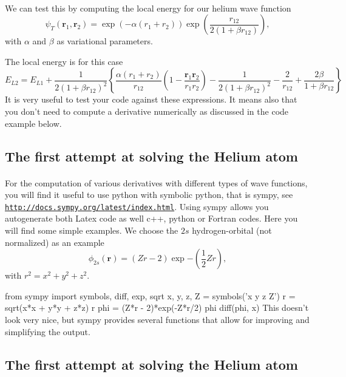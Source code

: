 \documentclass[%
twoside,                 %
final,                   %
10pt]{article}
\begin{document}
\paragraph{}

We can test this by computing the local energy for our helium wave function
\[
   \psi_{T}(\bm{r}_1,\bm{r}_2) = 
   \exp{\left(-\alpha(r_1+r_2)\right)}
   \exp{\left(\frac{r_{12}}{2(1+\beta r_{12})}\right)}, 
\]
with $\alpha$ and $\beta$ as variational parameters.

The local energy is for this case 
\[ 
E_{L2} = E_{L1}+\frac{1}{2(1+\beta r_{12})^2}\left\{\frac{\alpha(r_1+r_2)}{r_{12}}(1-\frac{\bm{r}_1\bm{r}_2}{r_1r_2})-\frac{1}{2(1+\beta r_{12})^2}-\frac{2}{r_{12}}+\frac{2\beta}{1+\beta r_{12}}\right\}
\]
It is very useful to test your code against these expressions. It means also that you don't need to
compute a derivative numerically as discussed in the code example below.



\subsection{The first attempt at solving the Helium atom}

\paragraph{}
For the computation of various derivatives with different types of wave functions, you will find it useful to use python with symbolic python, that is sympy, see \href{{http://docs.sympy.org/latest/index.html}}{\nolinkurl{http://docs.sympy.org/latest/index.html}}.  Using sympy allows you autogenerate both Latex code as well c++, python or Fortran codes. Here you will find some simple examples. We choose 
the $2s$ hydrogen-orbital  (not normalized) as an example
\[
 \phi_{2s}(\bm{r}) = (Zr - 2)\exp{-(\frac{1}{2}Zr)},
\]
with $ r^2 = x^2 + y^2 + z^2$.

\bpycod
from sympy import symbols, diff, exp, sqrt
x, y, z, Z = symbols('x y z Z')
r = sqrt(x*x + y*y + z*z)
r
phi = (Z*r - 2)*exp(-Z*r/2)
phi
diff(phi, x)
\epycod
This doesn't look very nice, but sympy provides several functions that allow for improving and simplifying the output.



\subsection{The first attempt at solving the Helium atom}
\end{document}
